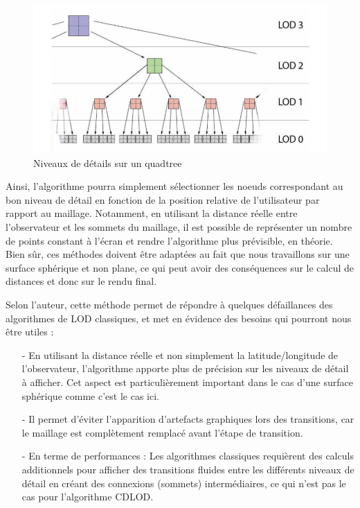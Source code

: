 \documentclass[12pt]{report}
\begin{document}
\vspace{0.3cm}

\begin{figure}[h]
\centering
\includegraphics[scale = 0.8]{images/CDLOD1.png}
\caption{Niveaux de détails sur un quadtree}
\end{figure}

\newpage

Ainsi, l'algorithme pourra simplement sélectionner les noeuds correspondant au bon niveau de détail en fonction de la position relative de l'utilisateur par rapport au maillage. Notamment, en utilisant la distance réelle entre l'observateur et les sommets du maillage, il est possible de représenter un nombre de points constant à l'écran et rendre l'algorithme plus prévisible, en théorie. Bien sûr, ces méthodes doivent être adaptées au fait que nous travaillons sur une surface sphérique et non plane, ce qui peut avoir des conséquences sur le calcul de distances et donc sur le rendu final.

Selon l'auteur, cette méthode permet de répondre à quelques défaillances des algorithmes de LOD classiques, et met en évidence des besoins qui pourront nous être utiles :

\begin{itemize}
    \item[-] En utilisant la distance réelle et non simplement la latitude/longitude de l'observateur, l'algorithme apporte plus de précision sur les niveaux de détail à afficher. Cet aspect est particulièrement important dans le cas d'une surface sphérique comme c'est le cas ici.
    \item[-] Il permet d'éviter l'apparition d'artefacts graphiques lors des transitions, car le maillage est complètement remplacé avant l'étape de transition.
    \item[-] En terme de performances : Les algorithmes classiques requièrent des calculs additionnels pour afficher des transitions fluides entre les différents niveaux de détail en créant des connexions (sommets) intermédiaires, ce qui n'est pas le cas pour l'algorithme CDLOD.
\end{itemize}
\end{document}

